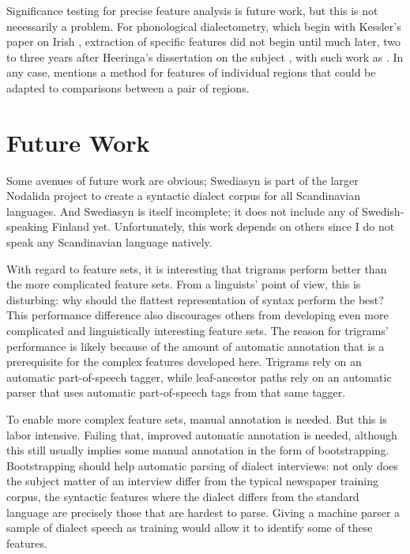 Significance testing for precise feature analysis is future work, but
this is not necessarily a problem. For phonological dialectometry,
which begin with Kessler's paper on Irish \cite{kessler95}, extraction
of specific features did not begin until much later, two to three
years after Heeringa's dissertation on the subject \cite{heeringa04},
with such work as .
In any case,  mentions a method for features of
individual regions that could be adapted to comparisons between a pair
of regions.

\section{Future Work}

Some avenues of future work are obvious; Swediasyn is part of the
larger Nodalida project to create a syntactic dialect corpus for all
Scandinavian languages. And Swediasyn is itself incomplete; it does
not include any of Swedish-speaking Finland yet. Unfortunately, this
work depends on others since I do not speak any
Scandinavian language natively.

With regard to feature sets, it is interesting that trigrams perform better
than the more complicated feature sets. From a linguists' point of
view, this is disturbing: why should the flattest representation of
syntax perform the best? This performance difference also
discourages others from developing even more complicated and
linguistically interesting feature sets. The reason for trigrams'
performance is likely because of the amount of automatic annotation
that is a prerequisite for the complex features developed
here. Trigrams rely on an automatic part-of-speech tagger, while
leaf-ancestor paths rely on an automatic parser that uses automatic
part-of-speech tags from that same tagger.

To enable more complex feature sets, manual annotation is needed. But
this is labor intensive. Failing that, improved automatic annotation
is needed, although this still usually implies some manual
annotation in the form of bootstrapping. Bootstrapping should help
automatic parsing of dialect interviews: not only does the subject
matter of an interview differ from the typical newspaper training
corpus, the syntactic features where the dialect differs from the
standard language are precisely those that are hardest to
parse. Giving a machine parser a sample of dialect speech as training
would allow it to identify some of these features.


